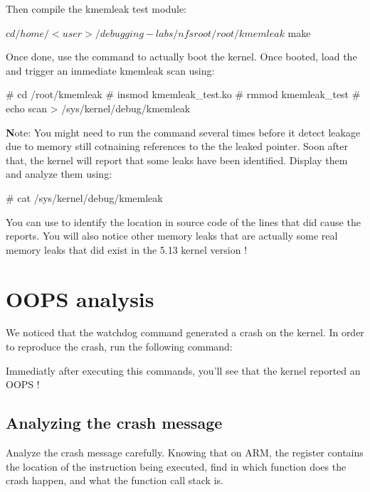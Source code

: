 Then compile the kmemleak test module:

\begin{bashinput}
$ cd /home/<user>/debugging-labs/nfsroot/root/kmemleak
$ make
\end{bashinput}

Once done, use the  command to actually boot the kernel. Once booted,
load the  and trigger an immediate kmemleak scan using:

\begin{bashinput}
# cd /root/kmemleak
# insmod kmemleak_test.ko
# rmmod kmemleak_test
# echo scan > /sys/kernel/debug/kmemleak
\end{bashinput}

{\textbf Note: You might need to run the  command several times
before it detect leakage due to memory still cotnaining references to the the
leaked pointer.} Soon after that, the kernel will report that some leaks have
been identified. Display them and analyze them using:

\begin{bashinput}
# cat /sys/kernel/debug/kmemleak
\end{bashinput}

You can use  to identify the location in source code of the
lines that did cause the reports. You will also notice other memory leaks that
are actually some real memory leaks that did exist in the 5.13 kernel version !

\section{OOPS analysis}
We noticed that the watchdog command generated a crash on the kernel. In order
to reproduce the crash, run the following command:


Immediatly after executing this commands, you'll see that the kernel reported
an OOPS !

\subsection{Analyzing the crash message}

Analyze the crash message carefully. Knowing that on ARM, the 
register contains the location of the instruction being executed, find
in which function does the crash happen, and what the function call
stack is.

